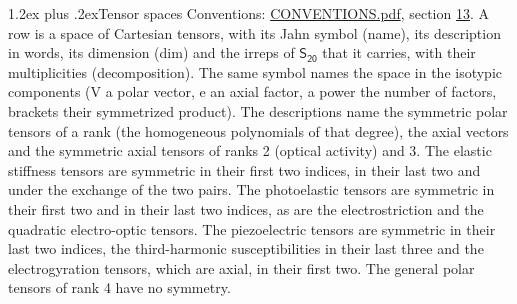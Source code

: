 \documentclass[10pt,a4paper]{article}
\makeatletter
\renewcommand\section{\@startsection{section}{1}{\z@}{-3ex plus -1ex minus -.2ex}%
  {1.2ex plus .2ex}{\normalfont\large\sffamily\bfseries\color{parttitle}}}
\numberwithin{equation}{section}
\newcommand{\grp}[1]{\mathsf{#1}}
\makeatother
\begin{document}
\section{Tensor spaces}\label{s:tensor_spaces}
Conventions: \href{../../CONVENTIONS.pdf}{CONVENTIONS.pdf}, section \href{../../CONVENTIONS.pdf\#conv.13}{13}.
\leavevmode\label{n:head.name}\label{n:head.description}\label{n:head.dim}\label{n:head.decomposition}A row is a space of Cartesian tensors, with its Jahn symbol (name), its description in words, its dimension (dim) and the irreps of $\grp{S_{20}}$ that it carries, with their multiplicities (decomposition). \label{n:label.jahn}The same symbol names the space in the isotypic components (V a polar vector, e an axial factor, a power the number of factors, brackets their symmetrized product). The descriptions name the symmetric polar tensors of a rank (the homogeneous polynomials of that degree), the axial vectors and the symmetric axial tensors of ranks 2 (optical activity) and 3. The elastic stiffness tensors are symmetric in their first two indices, in their last two and under the exchange of the two pairs. The photoelastic tensors are symmetric in their first two and in their last two indices, as are the electrostriction and the quadratic electro-optic tensors. The piezoelectric tensors are symmetric in their last two indices, the third-harmonic susceptibilities in their last three and the electrogyration tensors, which are axial, in their first two. The general polar tensors of rank 4 have no symmetry.
\end{document}
